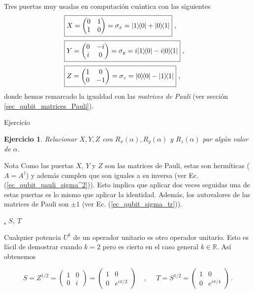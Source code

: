 \documentclass[a4paper,11pt]{book} %
\newtheorem{ejercicio_contador}{Ejercicio}
\newcommand{\Ejercicio}[1]{
		\begin{mybox_gray}{Ejercicio} 
			\begin{ejercicio_contador}
				 #1 
			\end{ejercicio_contador} 
		\end{mybox_gray}
	}
\numberwithin{equation}{chapter}
\def\lp{\left(}
\def\rp{\right)}
\newcommand{\ketbra}[2]{| #1\rangle \! \langle #2|}
\def\subsubiContadorIt{\par\addtocounter{subsubsection}{1}\underline{\it\thesubsubsection.}\hskip0.5cm \setcounter{subsubsubsectionIt}{0}}
\newcommand{\SubsubiIt}[1]{
		\subsubiContadorIt \textit{#1}
	}
\newcounter{subsubsubsectionIt}[subsubsection]
\begin{document}
Tres puertas muy usadas en computación cuántica con las siguientes
\begin{equation} \label{ec_puertas_simples_X_Y_Z}
\begin{split}
&\boxed{X = \lp  \begin{matrix}0&1\\1&0\end{matrix} \rp = \sigma_x = \ketbra{1}{0} + \ketbra{0}{1}}~, ~~~   \\ \rule{0mm}{7mm}
&\boxed{Y = \lp \begin{matrix}0&-i\\i&0\end{matrix} \rp = \sigma_y  =  i \ketbra{1}{0} - i \ketbra{0}{1}}~, ~~~ \\ \rule{0mm}{7mm}
&\boxed{Z = \lp  \begin{matrix}1&0\\0&-1\end{matrix} \rp = \sigma_z = \ketbra{0}{0} - \ketbra{1}{1}}  ~, ~~~ 
\end{split}
\end{equation}
donde hemos remarcado la igualdad con las \textit{matrices de Pauli} (ver sección \ref{sec_qubit_matrices_Pauli}).

\Ejercicio{
Relacionar  $X,Y,Z$ con   $R_x(\alpha),R_y(\alpha)$ y $R_z(\alpha)$ par algún valor de $\alpha$.
}
            
	\begin{mybox_blue}{Nota}
	Como las puertas $X$, $Y$ y $Z$ son las matrices de Pauli, estas son hermíticas ($A = A^\dagger$) y 
	además cumplen que son iguales a su inversa (ver Ec. (\ref{ec_qubit_pauli_sigma^2})). 
	Esto implica que aplicar dos veces seguidas una de estas puertas es lo mismo que aplicar la identidad. 
	Además, los autovalores de las matrices de Pauli son $\pm 1$ (ver Ec. (\ref{ec_qubit_sigma_tr})).
	\end{mybox_blue}


            \SubsubiIt{$S$, $T$}

Cualquier potencia $U^k$ de un operador unitario es otro operador unitario. Esto es fácil de demostrar cuando $k=2$ pero es cierto en el caso general $k\in{\mathbb R}$. Así obtenemos

	\begin{equation}
	\boxed{S = Z^{1/2} =  \lp\begin{matrix}1&0\\0&i\end{matrix}\rp = \lp\begin{matrix}1&0\\0&e^{i\pi/2}\end{matrix} \rp}
	~~~~~,~~~~~~ 
	\boxed{T = S^{1/2} = \lp \begin{matrix} 1&0 \\ 0 & e^{i\pi/4} \end{matrix} \rp} \, .
	\end{equation}
            
\end{document}

